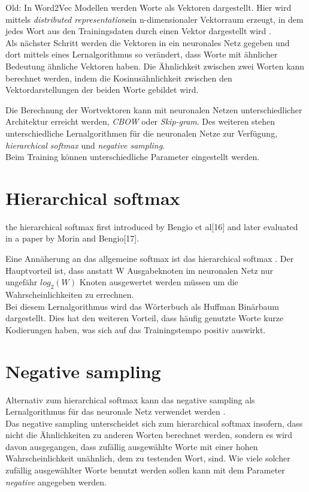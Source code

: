 \documentclass[12pt,a4paper]{report}
\begin{document}
Old:
In Word2Vec Modellen werden Worte als Vektoren dargestellt. Hier wird mittels \textit{distributed representation}ein n-dimensionaler Vektorraum erzeugt, in dem jedes Wort aus den Trainingsdaten durch einen Vektor dargestellt wird \cite{DBLP:journals/corr/abs-1301-3781}. \\
Als nächster Schritt werden die Vektoren in ein neuronales Netz gegeben und dort mittels eines Lernalgorithmus so verändert, dass Worte mit ähnlicher Bedeutung ähnliche Vektoren haben. Die Ähnlichkeit zwischen zwei Worten kann berechnet werden, indem die Kosinusähnlichkeit zwischen den Vektordarstellungen der beiden Worte gebildet wird.\\

\fi

Die Berechnung der Wortvektoren kann mit neuronalen Netzen unterschiedlicher Architektur erreicht werden, \textit{CBOW} oder \textit{Skip-gram}. Des weiteren stehen unterschiedliche Lernalgorithmen für die neuronalen Netze zur Verfügung, \textit{hierarchical softmax}  und \textit{negative sampling}.\\
Beim Training können unterschiedliche Parameter eingestellt werden.\\




	\section{Hierarchical softmax}
	 the hierarchical softmax first introduced by Bengio et al[16] and
later evaluated in a paper by Morin and Bengio[17].


	Eine Annäherung an das allgemeine softmax ist das hierarchical softmax \citep{DBLP:journals/corr/MikolovSCCD13}. Der Hauptvorteil ist, dass anstatt W Ausgabeknoten im neuronalen Netz nur ungefähr $log_2(W) $ Knoten ausgewertet werden müssen um die Wahrscheinlichkeiten zu errechnen. \\
	Bei diesem Lernalgorithmus wird das Wörterbuch als Huffman Binärbaum dargestellt. Dies hat den weiteren Vorteil, dass häufig genutzte Worte kurze Kodierungen haben, was sich auf das Trainingstempo positiv auswirkt.\\
	
	\section{Negative sampling}
	\label{sec:negativeSampling}
	Alternativ zum hierarchical softmax kann das negative sampling als Lernalgorithmus für das neuronale Netz verwendet werden \citep{DBLP:journals/corr/MikolovSCCD13}.\\
	Das negative sampling unterscheidet sich zum hierarchical softmax insofern, dass nicht die Ähnlichkeiten zu anderen Worten berechnet werden, sondern es wird davon ausgegangen, dass zufällig ausgewählte Worte mit einer hohen Wahrscheinlichkeit unähnlich, dem zu testenden Wort, sind. Wie viele solcher zufällig ausgewählter Worte benutzt werden sollen kann mit dem Parameter \textit{negative} angegeben werden.\\
	
\end{document}
